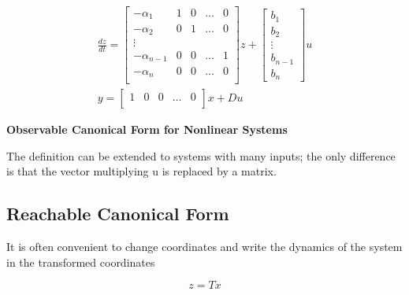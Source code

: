 \begin{eqnarray}
\frac{dz}{dt}= 
\begin{bmatrix}
 -\alpha_1 & 1 & 0 & \ldots &  0\\
 -\alpha_2 & 0 & 1 & \ldots &  0 \\
 \vdots \\
-\alpha_{n-1} & 0 & 0 & \ldots &  1 \\
-\alpha_{n} & 0 & 0 & \ldots &  0 \\
\end{bmatrix}z +
\begin{bmatrix}
 b_1 \\
 b_2 \\
 \vdots \\
 b_{n-1}\\
b_{n} 
\end{bmatrix}u \\
y = 
\begin{bmatrix}
 1 & 0 & 0 & \ldots & 0  \\
\end{bmatrix}x + Du
\end{eqnarray}


\begin{framed}
\theoremstyle{remark}
\begin{remark}{\textbf{Observable Canonical Form for Nonlinear Systems}}

The definition can be extended to systems with many inputs; the only difference is
that the vector multiplying u is replaced by a matrix.
\end{remark}
\end{framed}





















\subsection{Reachable Canonical Form}

It is often convenient to change coordinates and write the dynamics of the system in the transformed coordinates

\begin{equation}
z = Tx
\end{equation}

